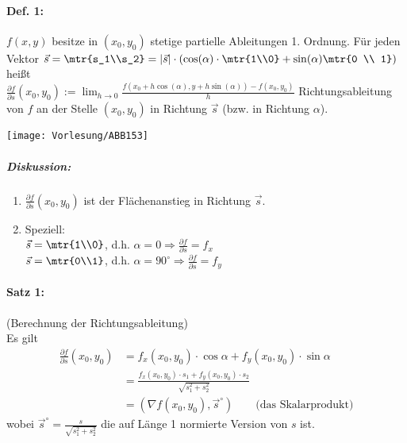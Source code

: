 \paragraph{Def. 1:} $f(x,y)$ besitze in $(x_0,y_0)$ stetige partielle Ableitungen 1. Ordnung. Für jeden Vektor $\vec{s}=\mtr{s_1\\s_2}=|\vec{s}| \cdot \left(\cos (\alpha)\cdot \mtr{1\\0}+ \sin (\alpha) \mtr{0 \\ 1}\right)$ heißt \\
$\frac{\partial f}{\partial s}(x_0,y_0):= \lim_{h\to 0} \frac{f(x_0+h \cos (\alpha) , y+h\sin (\alpha))-f(x_0,y_0)}{h}$ Richtungsableitung von $f$ an der Stelle $(x_0,y_0)$ in Richtung $\vec{s}$ (bzw. in Richtung $\alpha$).
\begin{center}
\texttt{[image: Vorlesung/ABB153]}
\end{center}

\subparagraph{Diskussion:} 
\begin{enumerate}
\item $\frac{\partial f}{\partial s}(x_0,y_0)$ ist der Flächenanstieg in Richtung $\vec{s}$.
\item Speziell: \\
$\vec{s}=\mtr{1\\0}$, d.h. $\alpha=0 \Rightarrow \frac{\partial f}{\partial s}=f_x$\\
$\vec{s}=\mtr{0\\1}$, d.h. $\alpha=90^\circ \Rightarrow \frac{\partial f}{\partial s}=f_y$
\end{enumerate}

\paragraph{Satz 1:} (Berechnung der Richtungsableitung)\\
Es gilt 
\begin{align*}
\frac{\partial f}{\partial s} (x_0,y_0) &= f_x(x_0,y_0) \cdot \cos \alpha + f_y (x_0,y_0) \cdot \sin \alpha \\
&= \frac{f_x(x_0,y_0) \cdot s_1+f_y (x_0,y_0) \cdot s_2}{\sqrt{s_1^2+s_2^2}}\\
&= \left( \nabla f(x_0,y_0) , \vec{s}^\circ \right)	\qquad \text{(das Skalarprodukt)}
\end{align*}
wobei $\vec{s}^\circ = \frac{s}{\sqrt{s_1^2+s_2^2}}$ die auf Länge 1 normierte Version von $s$ ist.

